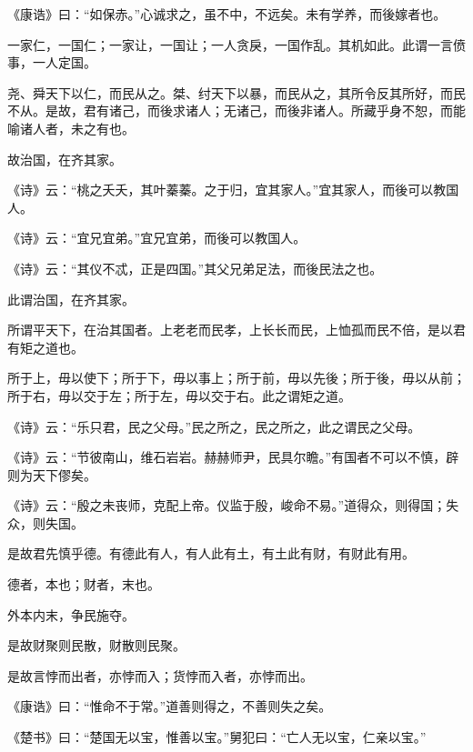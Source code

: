 \documentclass[twoside,openany]{book}
\begin{document}
\begin{pinyinscope}
《康诰》曰：“如保赤。”心诚求之，虽不中，不远矣。未有学养，而後嫁者也。

一家仁，一国仁；一家让，一国让；一人贪戾，一国作乱。其机如此。此谓一言偾事，一人定国。

尧、舜天下以仁，而民从之。桀、纣天下以暴，而民从之，其所令反其所好，而民不从。是故，君有诸己，而後求诸人；无诸己，而後非诸人。所藏乎身不恕，而能喻诸人者，未之有也。

故治国，在齐其家。

《诗》云：“桃之夭夭，其叶蓁蓁。之于归，宜其家人。”宜其家人，而後可以教国人。

《诗》云：“宜兄宜弟。”宜兄宜弟，而後可以教国人。

《诗》云：“其仪不忒，正是四国。”其父兄弟足法，而後民法之也。

此谓治国，在齐其家。

所谓平天下，在治其国者。上老老而民孝，上长长而民，上恤孤而民不倍，是以君有矩之道也。

所于上，毋以使下；所于下，毋以事上；所于前，毋以先後；所于後，毋以从前；所于右，毋以交于左；所于左，毋以交于右。此之谓矩之道。

《诗》云：“乐只君，民之父母。”民之所之，民之所之，此之谓民之父母。

《诗》云：“节彼南山，维石岩岩。赫赫师尹，民具尔瞻。”有国者不可以不慎，辟则为天下僇矣。

《诗》云：“殷之未丧师，克配上帝。仪监于殷，峻命不易。”道得众，则得国；失众，则失国。

是故君先慎乎德。有德此有人，有人此有土，有土此有财，有财此有用。

德者，本也；财者，末也。

外本内末，争民施夺。

是故财聚则民散，财散则民聚。

是故言悖而出者，亦悖而入；货悖而入者，亦悖而出。

《康诰》曰：“惟命不于常。”道善则得之，不善则失之矣。

《楚书》曰：“楚国无以宝，惟善以宝。”舅犯曰：“亡人无以宝，仁亲以宝。”


\end{pinyinscope}
\end{document}
